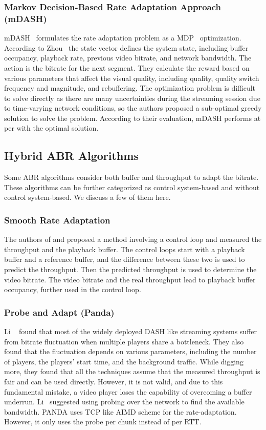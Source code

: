 \subsubsection{Markov Decision-Based Rate Adaptation Approach (mDASH)}
mDASH~\cite{7393865} formulates the rate adaptation problem as a \ac{MDP}~\cite{P-1066} optimization. According to Zhou \etal\, the state vector defines the system state, including buffer occupancy, playback rate, previous video bitrate, and network bandwidth. The action is the bitrate for the next segment. They calculate the reward based on various parameters that affect the visual quality, including quality, quality switch frequency and magnitude, and rebuffering. The optimization problem is difficult to solve directly as there are many uncertainties during the streaming session due to time-varying network conditions, so the authors proposed a sub-optimal greedy solution to solve the problem. According to their evaluation, mDASH performs at per with the optimal solution.

\subsection{Hybrid ABR Algorithms}
Some \ac{ABR} algorithms consider both buffer and throughput to adapt the bitrate. These algorithms can be further categorized as control system-based and without control system-based. We discuss a few of them here.

\subsubsection{Smooth Rate Adaptation}
The authors of \cite{10.1145/2413176.2413190} and \cite{6694183} proposed a method involving a control loop and measured the throughput and the playback buffer. The control loops start with a playback buffer and a reference buffer, and the difference between these two is used to predict the throughput. Then the predicted throughput is used to determine the video bitrate. The video bitrate and the real throughput lead to playback buffer occupancy, further used in the control loop.

\subsubsection{Probe and Adapt (Panda)}
Li \etal~\cite{140405} found that most of the widely deployed \ac{DASH} like streaming systems suffer from bitrate fluctuation when multiple players share a bottleneck. They also found that the fluctuation depends on various parameters, including the number of players, the players' start time, and the background traffic. While digging more, they found that all the techniques assume that the measured throughput is fair and can be used directly. However, it is not valid, and due to this fundamental mistake, a video player loses the capability of overcoming a buffer underrun. Li \etal\ suggested using probing over the network to find the available bandwidth. PANDA uses \ac{TCP} like \ac{AIMD} scheme for the rate-adaptation. However, it only uses the probe per chunk instead of per \ac{RTT}.

